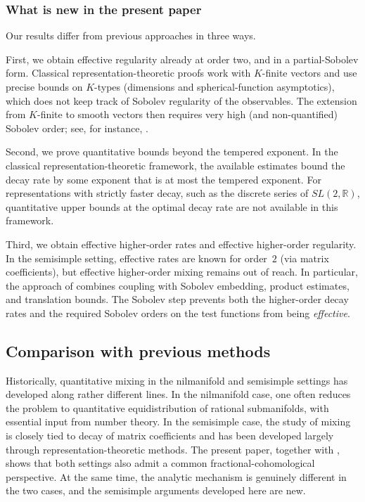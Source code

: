\documentclass[11 pt]{amsart}
\newcommand{\RR}{\mathbb{R}}
\theoremstyle{definition}
\numberwithin{equation}{section}
\begin{document}
\subsubsection{What is new in the present paper} Our results differ from previous approaches in three ways.



First, we obtain effective regularity already at order two, and in a partial-Sobolev form. Classical representation-theoretic
proofs work with $K$-finite vectors and use precise bounds on $K$-types
(dimensions and spherical-function asymptotics), which does
not keep track of Sobolev regularity of the observables. The extension from $K$-finite to smooth vectors then requires very
high (and non-quantified) Sobolev order; see, for instance, \cite{Spatzier1}.




Second, we prove quantitative bounds beyond the tempered exponent. In the classical representation-theoretic framework, the available estimates bound the decay rate by some
exponent that is at most the tempered exponent. For representations with strictly faster decay, such as the discrete series of \(SL(2,\RR)\), quantitative upper bounds at the optimal decay rate are not available in this framework.


Third, we obtain effective higher-order rates and effective higher-order regularity. In the semisimple setting, effective rates are known for order~$2$ (via matrix coefficients), but effective higher-order mixing remains out of reach. In particular, the approach of \cite{BEG} combines coupling with Sobolev embedding, product estimates, and translation bounds. The Sobolev step prevents both the higher-order decay rates and the required Sobolev orders on the test functions from being \emph{effective}.



\subsection{Comparison with previous methods}  Historically, quantitative mixing in the nilmanifold and semisimple settings has developed along rather different lines. In the nilmanifold case, one often reduces the problem to quantitative equidistribution of rational submanifolds, with essential input from number theory. In the semisimple case, the study of mixing is closely tied to decay of matrix coefficients and has been developed largely through representation-theoretic methods. The present paper, together with \cite{W2}, shows that both settings also admit a common fractional-cohomological perspective. At the same time, the analytic mechanism is genuinely different in the two cases, and the semisimple arguments developed here are new.
\end{document}
